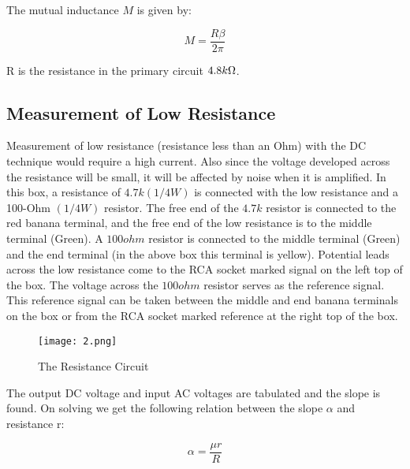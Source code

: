 		The mutual inductance $M$ is given by:

		\begin{equation}
			M = \frac{R\beta}{2\pi}
			\label{eqn:1}
		\end{equation}

		R is the resistance in the primary circuit $4.8 k\ohm$.
	
	\subsection{Measurement of Low Resistance}
		Measurement of low resistance (resistance less than an Ohm) with the DC technique would require a high current. Also since the voltage developed across the resistance will be small, it will be affected by noise when it is amplified. In this box, a resistance of $4.7 k (1/4 W)$ is connected with the low resistance and a 100-Ohm $(1/4 W)$ resistor. The free end of the $4.7k$ resistor is connected to the red banana terminal, and the free end of the low resistance is to the middle terminal (Green). A $100ohm$ resistor is connected to the middle terminal (Green) and the end terminal (in the above box this terminal is yellow). Potential leads across the low resistance come to the RCA socket marked signal on the left top of the box. The voltage across the $100ohm$ resistor serves as the reference signal. This reference signal can be taken between the middle and end banana terminals on the box or from the RCA socket marked reference at the right top of the box.
	
		\begin{figure}[H]
			\centering
			\texttt{[image: 2.png]}
			\caption{The Resistance Circuit}
			\label{fig:2}
		\end{figure}

		The output DC voltage and input AC voltages are tabulated and the slope is found. On solving we get the following relation between the slope $\alpha$ and resistance r:

		\begin{equation}
			\alpha = \frac{\mu r}{R}
			\label{eqn:2}
		\end{equation}
